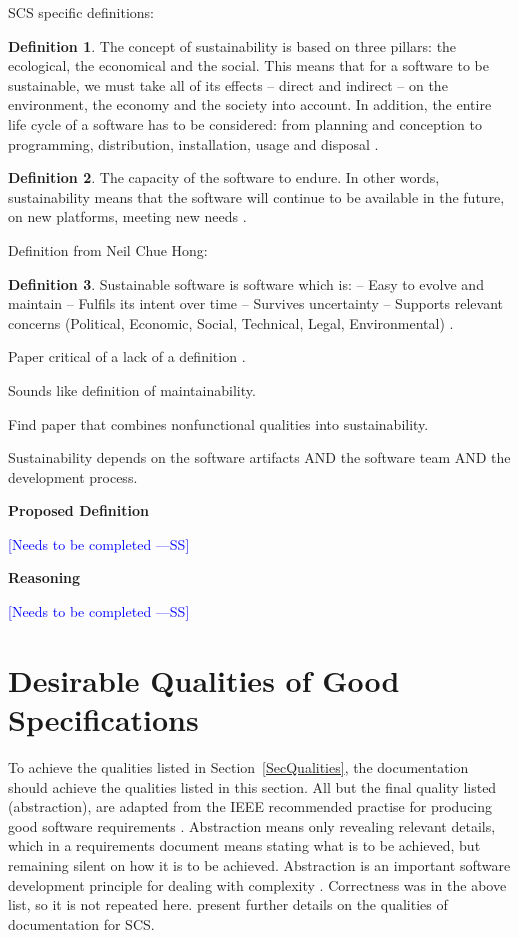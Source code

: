 \documentclass[letterpaper,cleveref]{lipics-v2019}
\newcommand{\authornote}[3]{\textcolor{#1}{[#3 ---#2]}}
\newcommand{\authornote}[3]{}
\newcommand{\wss}[1]{\authornote{blue}{SS}{#1}} %
\theoremstyle{definition}
\newtheorem{defn}{Definition}
\begin{document}
SCS specific definitions:

\begin{defn}
  The concept of sustainability is based on three pillars: the
  ecological, the economical and the social. This means that for a software to
  be sustainable, we must take all of its effects -- direct and indirect -- on
  the environment, the economy and the society into account. In addition, the
  entire life cycle of a software has to be considered: from planning and
  conception to programming, distribution, installation, usage and
  disposal \citep{Heine2017}.
\end{defn}

\begin{defn}
  \noindent The capacity of the software to endure. In other words,
  sustainability means that the software will continue to be available in the
  future, on new platforms, meeting new needs \citep{Katz2016}.
\end{defn}

Definition from Neil Chue Hong:
\begin{defn}
Sustainable software is software which is:
-- Easy to evolve and maintain
-- Fulfils its intent over time
-- Survives uncertainty
-- Supports relevant concerns (Political, Economic, Social, Technical,
Legal, Environmental) \citep{Katz2016}.
\end{defn}

Paper critical of a lack of a definition \citep{VentersEtAl2014}.

Sounds like definition of maintainability.

Find paper that combines nonfunctional qualities into sustainability.

Sustainability depends on the software artifacts AND the software team AND the
development process.

\noindent \textbf{Proposed Definition} 

\wss{Needs to be completed}

\noindent \textbf{Reasoning}

\wss{Needs to be completed}

\section{Desirable Qualities of Good Specifications} \label{SecDesirableQs}

To achieve the qualities listed in Section~\ref{SecQualities}, the documentation
should achieve the qualities listed in this section.  All but the final quality
listed (abstraction), are adapted from the IEEE recommended practise for
producing good software requirements \citep{IEEE1998}.  Abstraction means only
revealing relevant details, which in a requirements document means stating what
is to be achieved, but remaining silent on how it is to be achieved.
Abstraction is an important software development principle for dealing with
complexity \citep[p.~40]{GhezziEtAl2003}.  Correctness was in the above list, so
it is not repeated here.  \citet{SmithAndKoothoor2016} present further details
on the qualities of documentation for SCS.
\end{document}
